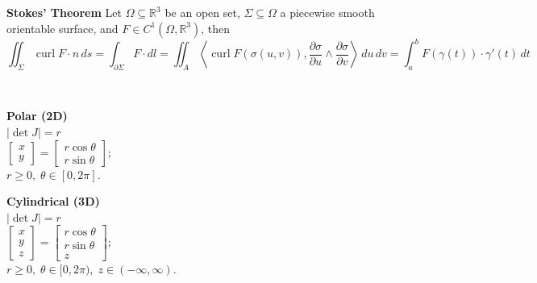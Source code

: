 \documentclass[8pt]{article}
\begin{document}
\hfill
\begin{minipage}[htp]{0.49\textwidth}
	\vspace{-10px}
	\noindent\textbf{Stokes' Theorem}
	Let \( \Omega \subseteq \mathbb{R}^3 \) be an open set, \( \Sigma \subseteq \Omega \) a piecewise smooth orientable surface, and \( F \in C^1(\Omega, \mathbb{R}^3) \), then
	\vspace{-10px}
	\[
		\iint_{\Sigma} \operatorname{curl} F \cdot n \, ds
		= \int_{\partial \Sigma} F \cdot dl
		= \iint_{A} \left\langle \operatorname{curl} F(\sigma(u,v)), \frac{\partial \sigma}{\partial u} \wedge \frac{\partial \sigma}{\partial v} \right\rangle \, du \, dv
		= \int_{a}^{b} F(\gamma(t)) \cdot \gamma'(t) \, dt
	\]

\end{minipage}\\ \vspace{-10px}
\begin{minipage}[t]{0.27\textwidth}
	\centering
	\noindent  \textbf{Polar (2D)} \\[4pt]
	\(|\det J| = r\) \\[4pt]
	\(\displaystyle
	\begin{bmatrix}
		x \\[4pt]
		y
	\end{bmatrix}
	=
	\begin{bmatrix}
		r\cos\theta \\[4pt]
		r\sin\theta
	\end{bmatrix};
	\) \\[4pt]
	\( r \geq 0, \; \theta \in [0, 2\pi] \).
\end{minipage}
\hfill
\begin{minipage}[t]{0.27\textwidth}
	\centering
	\textbf{Cylindrical (3D)} \\[4pt]
	\(|\det J| = r\) \\[4pt]
	\(\displaystyle
	\begin{bmatrix}
		x \\[4pt]
		y \\[4pt]
		z
	\end{bmatrix}
	=
	\begin{bmatrix}
		r\cos\theta \\[4pt]
		r\sin\theta \\[4pt]
		z
	\end{bmatrix};
	\) \\[4pt]
	\( r \geq 0, \; \theta \in [0, 2\pi), \; z \in (-\infty, \infty) \).
\end{minipage}
\hfill
\end{document}
